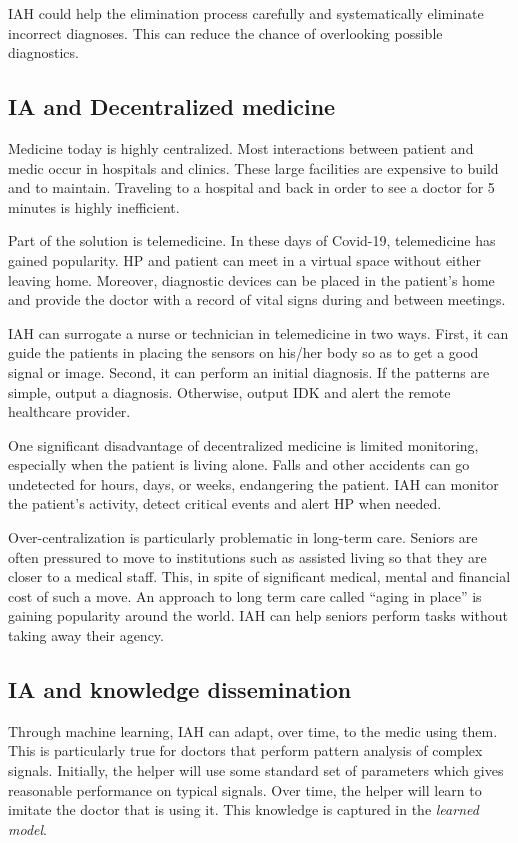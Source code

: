 \documentclass[11pt]{pnas-new}
\begin{document}
IAH could help the elimination process carefully and
systematically eliminate incorrect diagnoses. This can reduce the chance of overlooking possible diagnostics.

\subsection{IA and Decentralized medicine}

Medicine today is highly centralized. Most interactions
between patient and medic occur in hospitals and clinics. These
large facilities are expensive to build and to maintain. Traveling to
a hospital and back in order to see a doctor for 5 minutes is highly
inefficient. 

Part of the solution is telemedicine. In these days of Covid-19,
telemedicine has gained popularity. HP and patient can meet in a
virtual space without either leaving home. Moreover, diagnostic
devices can be placed in the patient's home and provide the doctor with
{a record of vital signs during and between meetings.}


IAH can surrogate a nurse or technician in telemedicine in two ways. First,
it can guide the patients in placing the sensors on his/her
body so as to get a good signal or image. Second, it can perform an
initial diagnosis. If the patterns are simple, output a diagnosis.
Otherwise, output IDK and alert the remote healthcare provider. 

One significant disadvantage of decentralized medicine is {limited} monitoring, especially when the patient is living alone. 
Falls and other accidents can go undetected for hours, days, or weeks, endangering the patient. IAH can monitor the patient's activity, detect critical events and alert HP when needed.

Over-centralization is particularly problematic in long-term care.
Seniors are often pressured to move to institutions such as
assisted living so that they are closer to a medical staff. This, in
spite of significant medical, mental and financial cost of such a
move. An approach to long term care called ``aging in
place'' is gaining popularity around the world. IAH can help
seniors perform tasks without taking away their agency.


\subsection{IA and knowledge dissemination}

Through machine learning, IAH can adapt, over time, to the
medic using them. This is particularly true for  doctors that
perform pattern analysis of complex signals. Initially, the helper will
use some standard set of parameters which gives reasonable performance on
typical signals. Over time, the helper will learn to imitate the
doctor that is using it. This knowledge is captured in the  {\em learned model}.
\end{document}
